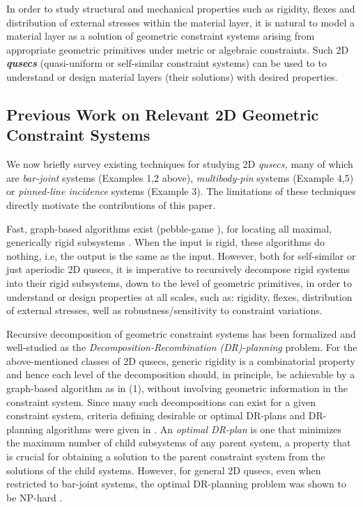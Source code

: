In order to study structural and mechanical properties such as rigidity, flexes and distribution of external stresses 
within the material layer, it is natural to model a material layer as a solution of geometric constraint systems 
arising from appropriate geometric primitives under metric or algebraic constraints. 
Such  2D {\bf{\em qusecs}} (quasi-uniform or self-similar constraint systems) can be used to 
to understand or design material layers (their solutions) with desired properties.

\subsection{Previous Work on Relevant 2D Geometric Constraint Systems}
We now briefly survey existing techniques for studying 2D {\em qusecs,}  many of which are
{\it bar-joint} systems (Examples 1,2 above), {\it multibody-pin} systems (Example 4,5) or {\it pinned-line incidence} systems (Example 3). 
The limitations of these techniques directly motivate the contributions of this paper.

\medskip\noindent{}
Fast, graph-based algorithms exist (pebble-game \cite{XX}),   
for locating all maximal, generically rigid subsystems \cite{XX}. 
When the input is rigid, these algorithms do nothing, i.e, the output is the same as the input.
However, both for self-similar or just aperiodic 2D qusecs, it is imperative to recursively decompose rigid systems 
into their rigid subsystems, down to the level of geometric primitives, in order to 
understand or design properties at all scales, such as: rigidity, flexes, distribution 
of external stresses,  well as robustness/sensitivity to constraint variations.
 
\medskip\noindent{}
Recursive decomposition of geometric constraint systems has been formalized \cite{XX} and well-studied \cite{XX} 
as the {\sl Decomposition-Recombination (DR)-planning} problem.
For the above-mentioned classes of 2D qusecs, generic rigidity is 
a combinatorial property and hence each level of the decomposition should, in principle, be achievable by a graph-based algorithm as in (1), without
involving geometric information in the constraint system.  
Since many  such decompositions can exist for a given constraint system, 
criteria defining desirable or optimal DR-plans and DR-planning algorithms were given in \cite{XX}. An {\em optimal DR-plan} is one
that minimizes the maximum number of child subsystems of any parent system, a property that is 
crucial for obtaining a solution to the parent constraint system from the solutions of the child systems.
However, for general 2D qusecs, even when restricted to bar-joint systems, 
the optimal DR-planning problem was shown to be NP-hard \cite{XX}.

